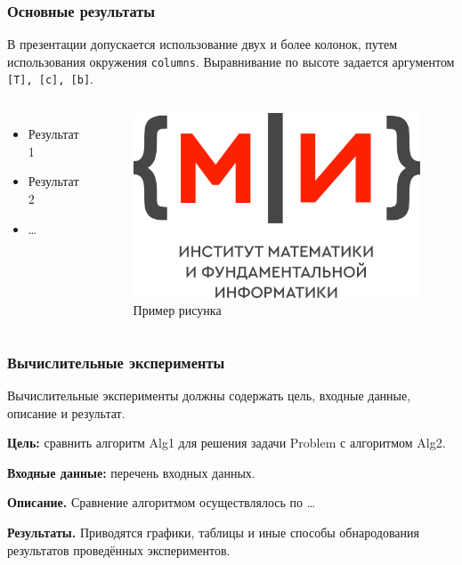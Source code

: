 \documentclass[12pt, aspectratio=1610]{beamer}
\begin{document}
\begin{frame}[fragile]
	\frametitle{Основные результаты}
	В презентации допускается использование двух и более колонок, путем использования окружения \verb!columns!. Выравнивание по высоте задается аргументом \verb|[T], [c], [b]|.
	\begin{columns}[T]
		\begin{itemize}
			\item Результат 1
			\item Результат 2
			\item \dots
		\end{itemize}		
		\begin{figure}
			\includegraphics[width=\textwidth]{IMLogo.png}	
			\caption{Пример рисунка}
		\end{figure}		
	\end{columns}
\end{frame}


\begin{frame}
	\frametitle{Вычислительные эксперименты}
	\justifying
	\label{Exp1}
	\begin{block}{}
		Вычислительные эксперименты должны содержать цель, входные данные, описание и результат.
	\end{block}
	\textbf{Цель:} сравнить алгоритм Alg1 для решения задачи Problem с алгоритмом Alg2.
	
	\textbf{Входные данные:} перечень входных данных.

	\textbf{Описание.} Сравнение алгоритмом осуществлялось по \dots

	\textbf{Результаты.} Приводятся графики, таблицы и иные способы обнародования результатов проведённых экспериментов.	
	
	\hyperlink{Results1}{}
\end{frame}
\end{document}
